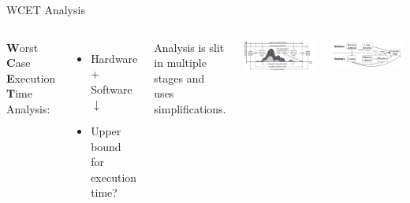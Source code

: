 \documentclass{beamer}
\begin{document}
\begin{frame}{WCET Analysis}
    \begin{columns}
        

    \textbf{W}orst \textbf{C}ase \textbf{E}xecution \textbf{T}ime Analysis:
    \begin{itemize}
        \item Hardware + Software $\downarrow$
        \item Upper bound for execution time?
    \end{itemize}


    \begin{block}{}
        Analysis is slit in multiple stages and uses simplifications.
    \end{block}


    \includegraphics[width=1\textwidth]{pic/timing-distribution.png}

    \includegraphics[width=1\textwidth]{pic/wcet-deps.png}

    \end{columns}
\end{frame}

\end{document}
